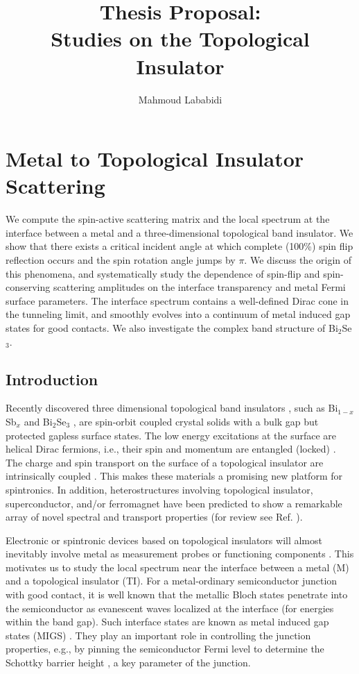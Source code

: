 \documentclass[11pt]{report}
\title{Thesis Proposal: \\Studies on the Topological Insulator}
\author{Mahmoud Lababidi}
\begin{document}
\chapter{Metal to Topological Insulator Scattering}


We compute the spin-active scattering matrix and the local spectrum at the interface between a metal and a three-dimensional  topological band insulator. We show that there exists a critical incident angle at which complete (100\%) spin flip reflection occurs and the spin rotation angle jumps by $\pi$. We discuss the origin of this phenomena, and systematically study
the dependence of spin-flip and spin-conserving scattering amplitudes on
the interface transparency and metal Fermi surface parameters.
The interface spectrum contains a well-defined Dirac cone in the tunneling limit, and smoothly evolves into a continuum of metal induced gap states for good contacts. We also investigate the complex band structure of Bi$_2$Se$_3$.

\section{Introduction}
Recently discovered three dimensional topological band insulators \cite{fu07,moore,roy}, such as Bi$_{1-x}$Sb$_x$ \cite{Hsieh2008} and Bi$_2$Se$_3$ \cite{Xia09,zhang2009,Chen09}, are spin-orbit coupled crystal solids with a bulk gap but protected gapless surface states. The low energy excitations at the surface are helical Dirac fermions, i.e., their spin and momentum are entangled (locked) \cite{Hsieh2009}. The charge and spin transport on the surface of a topological insulator
are intrinsically coupled \cite{burkov}.
This makes these materials a promising new platform for spintronics. In addition, heterostructures involving topological insulator, superconductor, and/or ferromagnet have been predicted to show a remarkable array of novel spectral and transport properties (for review
see Ref. \cite{today,rmp,Qi-zhang-rev}). 

Electronic or spintronic devices based on topological insulators will almost inevitably involve metal as measurement probes or functioning components \cite{yokoyama09}. This motivates us to study the local spectrum near the interface between a metal (M) and a topological insulator (TI). For a metal-ordinary semiconductor junction with good contact, it is well known that the metallic Bloch states penetrate into the semiconductor as evanescent waves localized at the interface (for energies within the band gap). Such interface states are known as metal induced gap states (MIGS) \cite{heine65,cohen}. They play an important role in controlling the junction properties, e.g., by pinning the semiconductor Fermi level to determine the Schottky barrier height \cite{tersoff}, a key parameter of the junction.
\end{document}
